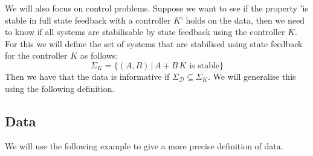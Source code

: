 We will also focus on control problems. Suppose we want to see if the property 'is stable in full state feedback with a controller $K$' holds on the data, then we need to know if all systems are stabilisable by state feedback using the controller $K$. For this we will define the set of systems that are stabilised using state feedback for the controller $K$ as follows:
\[ \Sigma_K = \{ (A,B) \, | \, A + B \, K \mbox{ is stable} \} \]
Then we have that the data is informative if $\Sigma_\mathcal{D} \subseteq \Sigma_K$. We will generalise this using the following definition.



\subsection{Data}
We will use the following example \cite[Ex 2]{waarde2019data} to give a more precise definition of data.



